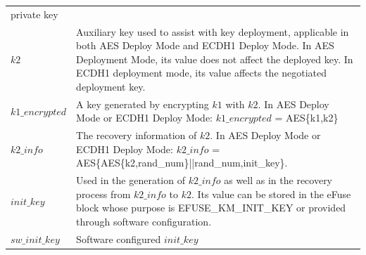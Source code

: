 \documentclass[main\_\_EN.tex]{subfiles}
\begin{document}
\begin{longtable}[c]{ R{6cm} p{10cm} }
private key \\
\textbf{\begin{math}k2\end{math}} \label{para:k2} & Auxiliary key used to assist with key deployment, applicable in both AES Deploy Mode and ECDH1 Deploy Mode. In AES Deployment Mode, its value does not affect the deployed key. In ECDH1 deployment mode, its value affects the negotiated deployment key. \\ 
\textbf{\begin{math}k1\_encrypted\end{math}}\label{para:k1enc} & A key generated by encrypting \begin{math}k1\end{math} with \begin{math}k2\end{math}. In AES Deploy Mode or ECDH1 Deploy Mode: \begin{math}k1\_encrypted\end{math} = AES\{k1,k2\}\\
\textbf{\begin{math}k2\_info\end{math}}\label{para:k2info} & The recovery information of \begin{math}k2\end{math}. In AES Deploy Mode or ECDH1 Deploy Mode: \begin{math}k2\_info\end{math} = AES\{AES\{k2,rand\_num\}||rand\_num,init\_key\}.\\
\textbf{\begin{math}init\_key\end{math}}\label{para:initkey} & Used in the generation of \begin{math}k2\_info\end{math} as well as in the recovery process from \begin{math}k2\_info\end{math} to \begin{math}k2\end{math}. Its value can be stored in the eFuse block whose purpose is EFUSE\_KM\_INIT\_KEY or provided through software configuration. \\
\textbf{\begin{math}sw\_init\_key\end{math}} \label{para:swinitkey} & Software configured  \begin{math}init\_key\end{math}\\

\end{longtable}
\end{document}
